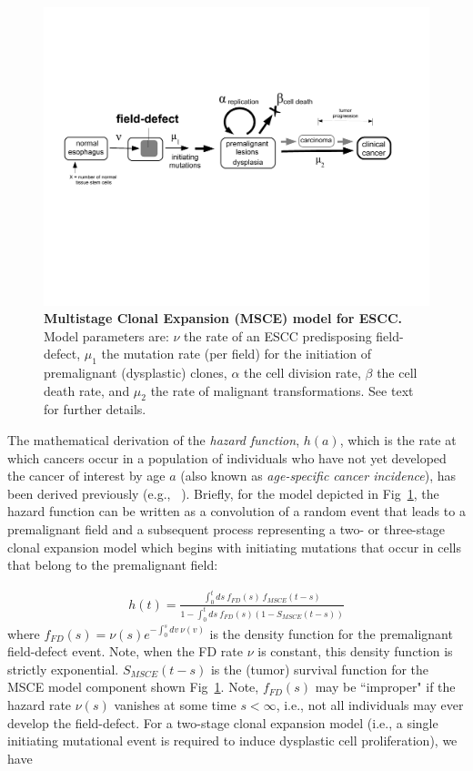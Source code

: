 \documentclass[10pt,letterpaper]{article}
\begin{document}
\medskip
\begin{figure}[!ht]
\begin{adjustwidth}{-1.in}{0in} %
\includegraphics[scale=0.6, trim=0 0 0 0]{FEFF-model-2.pdf}
\caption{{\bf Multistage Clonal Expansion (MSCE) model for ESCC.} Model parameters are: $\nu$ the rate of an ESCC predisposing field-defect, $\mu_1$ the mutation rate (per field) for the initiation of premalignant (dysplastic) clones, $\alpha$ the cell division rate, $\beta$ the cell death rate, and $\mu_2$ the rate of malignant transformations. See text for further details.}
\label{fig1}
\end{adjustwidth}
\end{figure}

The mathematical derivation of the {\it hazard function}, $h(a)$, which is the rate at which cancers occur in a population of individuals who have not yet developed the cancer of interest by age $a$ (also known as {\it age-specific cancer incidence}), has been derived previously (e.g., ~\cite{Jeon2006}). Briefly, for the model depicted in Fig~\ref{fig1}, the hazard function can be written as a convolution of a random event that leads to a premalignant field and a subsequent process representing a two- or three-stage clonal expansion model which begins with initiating mutations that occur in cells that belong to the premalignant field:

\begin{eqnarray}
\label{eq:hazard}
    h(t) = \frac{\int_0^t ds \ f_{FD}(s)\ f_{MSCE}(t-s)}{1-\int_0^t ds \ f_{FD}(s)(1-S_{MSCE}(t-s))} 
\end{eqnarray}
where $f_{FD}(s) = \nu(s) e^{-\int_0^s dv \ \nu(v)}$ is the density function for the premalignant field-defect event. Note, when the FD rate $\nu$ is constant, this density function is strictly exponential. $S_{MSCE}(t-s)$ is the (tumor) survival function for the MSCE model component shown Fig~\ref{fig1}. Note, $f_{FD}(s)$ may be ``improper" if the hazard rate $\nu(s)$ vanishes at some time $s< \infty$, i.e., not all individuals may ever develop the field-defect. For a two-stage clonal expansion model (i.e., a single initiating mutational event is required to induce dysplastic cell proliferation), we have
\end{document}
